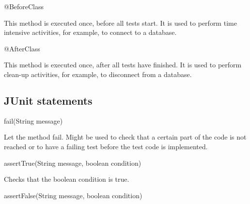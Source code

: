 \documentclass[
]{book}
\newenvironment{Shaded}{\begin{snugshade}}{\end{snugshade}}
\newcommand{\AttributeTok}[1]{\textcolor[rgb]{0.77,0.63,0.00}{#1}}
\newcommand{\BuiltInTok}[1]{#1}
\newcommand{\DataTypeTok}[1]{\textcolor[rgb]{0.13,0.29,0.53}{#1}}
\newcommand{\FunctionTok}[1]{\textcolor[rgb]{0.00,0.00,0.00}{#1}}
\newcommand{\NormalTok}[1]{#1}
\begin{document}
\begin{Shaded}
\begin{Highlighting}[]
\AttributeTok{@BeforeClass}
\end{Highlighting}
\end{Shaded}

This method is executed once, before all tests start. It is used to perform time intensive activities, for example, to connect to a database.

\begin{Shaded}
\begin{Highlighting}[]
\AttributeTok{@AfterClass}
\end{Highlighting}
\end{Shaded}

This method is executed once, after all tests have finished. It is used to perform clean-up activities, for example, to disconnect from a database.

\hypertarget{junit-statements}{%
\subsection{JUnit statements}\label{junit-statements}}

\begin{Shaded}
\begin{Highlighting}[]
\FunctionTok{fail}\NormalTok{(}\BuiltInTok{String}\NormalTok{ message)}
\end{Highlighting}
\end{Shaded}

Let the method fail. Might be used to check that a certain part of the code is not reached or to have a failing test before the test code is implemented.

\begin{Shaded}
\begin{Highlighting}[]
\FunctionTok{assertTrue}\NormalTok{(}\BuiltInTok{String}\NormalTok{ message, }\DataTypeTok{boolean}\NormalTok{ condition)}
\end{Highlighting}
\end{Shaded}

Checks that the boolean condition is true.

\begin{Shaded}
\begin{Highlighting}[]
\FunctionTok{assertFalse}\NormalTok{(}\BuiltInTok{String}\NormalTok{ message, }\DataTypeTok{boolean}\NormalTok{ condition)}
\end{Highlighting}
\end{Shaded}
\end{document}
